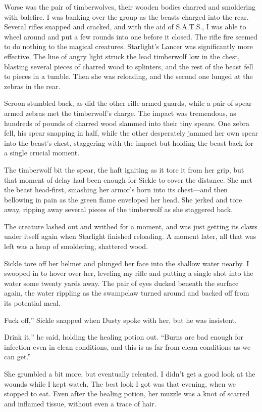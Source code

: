 Worse was the pair of timberwolves, their wooden bodies charred and smoldering with balefire. I was banking over the group as the beasts charged into the rear. Several rifles snapped and cracked, and with the aid of S.A.T.S., I was able to wheel around and put a few rounds into one before it closed. The rifle fire seemed to do nothing to the magical creatures. Starlight’s Lancer was significantly more effective. The line of angry light struck the lead timberwolf low in the chest, blasting several pieces of charred wood to splinters, and the rest of the beast fell to pieces in a tumble. Then she was reloading, and the second one lunged at the zebras in the rear.

Seroon stumbled back, as did the other rifle-armed guards, while a pair of spear-armed zebras met the timberwolf’s charge. The impact was tremendous, as hundreds of pounds of charred wood slammed into their tiny spears. One zebra fell, his spear snapping in half, while the other desperately jammed her own spear into the beast’s chest, staggering with the impact but holding the beast back for a single crucial moment.

The timberwolf bit the spear, the haft igniting as it tore it from her grip, but that moment of delay had been enough for Sickle to cover the distance. She met the beast head-first, smashing her armor’s horn into its chest—and then bellowing in pain as the green flame enveloped her head. She jerked and tore away, ripping away several pieces of the timberwolf as she staggered back.

The creature lashed out and writhed for a moment, and was just getting its claws under itself again when Starlight finished reloading. A moment later, all that was left was a heap of smoldering, shattered wood.

Sickle tore off her helmet and plunged her face into the shallow water nearby. I swooped in to hover over her, leveling my rifle and putting a single shot into the water some twenty yards away. The pair of eyes ducked beneath the surface again, the water rippling as the swampclaw turned around and backed off from its potential meal.

\leavevmode{}Fuck off,” Sickle snapped when Dusty spoke with her, but he was insistent.

\leavevmode{}Drink it,” he said, holding the healing potion out. “Burns are bad enough for infection even in clean conditions, and this is as far from clean conditions as we can get.”

She grumbled a bit more, but eventually relented. I didn’t get a good look at the wounds while I kept watch. The best look I got was that evening, when we stopped to eat. Even after the healing potion, her muzzle was a knot of scarred and inflamed tissue, without even a trace of hair.

